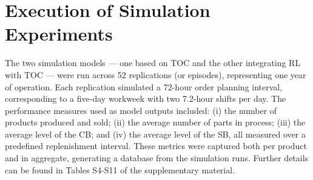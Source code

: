 \section{Execution of Simulation
Experiments}\label{execution-of-simulation-experiments}

The two simulation models --- one based on TOC and the other integrating
RL with TOC --- were run across 52 replications (or episodes),
representing one year of operation. Each replication simulated a 72-hour
order planning interval, corresponding to a five-day workweek with two
7.2-hour shifts per day. The performance measures used as model outputs
included: (i) the number of products produced and sold; (ii) the average
number of parts in process; (iii) the average level of the CB; and (iv)
the average level of the SB, all measured over a predefined
replenishment interval. These metrics were captured both per product and
in aggregate, generating a database from the simulation runs. Further
details can be found in Tables S4-S11 of the supplementary material.
